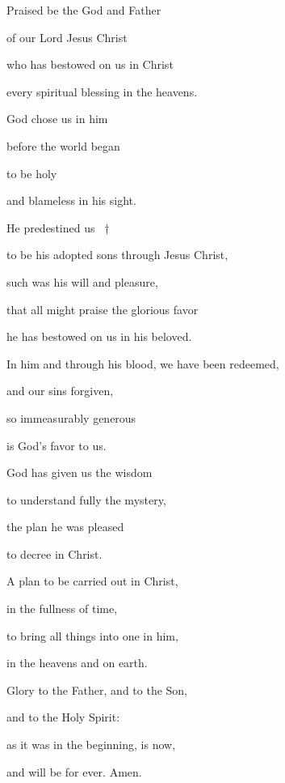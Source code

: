 \noindent Praised be the God and Father ~\GreStar{}~\nopagebreak

of our Lord Jesus Christ

\noindent who has bestowed on us in Christ ~\GreStar{}~\nopagebreak

every spiritual blessing in the heavens.

\noindent God chose us in him ~\GreStar{}~\nopagebreak

before the world began

\noindent to be holy ~\GreStar{}~\nopagebreak

and blameless in his sight.

\noindent He predestined us ~†~\nopagebreak

to be his adopted sons through Jesus Christ, ~\GreStar{}~\nopagebreak

such was his will and pleasure,

\noindent that all might praise the glorious favor ~\GreStar{}~\nopagebreak

he has bestowed on us in his beloved.

\noindent In him and through his blood, we have been redeemed, ~\GreStar{}~\nopagebreak

and our sins forgiven,

\noindent so immeasurably generous ~\GreStar{}~\nopagebreak

is God’s favor to us.

\noindent God has given us the wisdom ~\GreStar{}~\nopagebreak

to understand fully the mystery,

\noindent the plan he was pleased ~\GreStar{}~\nopagebreak

to decree in Christ.

\noindent A plan to be carried out in Christ, ~\GreStar{}~\nopagebreak

in the fullness of time,

\noindent to bring all things into one in him, ~\GreStar{}~\nopagebreak

in the heavens and on earth.

\noindent Glory to the Father, and to the Son,~\GreStar{}~\nopagebreak

and to the Holy Spirit:

\noindent as it was in the beginning, is now,~\GreStar{}~\nopagebreak

and will be for ever. Amen.
